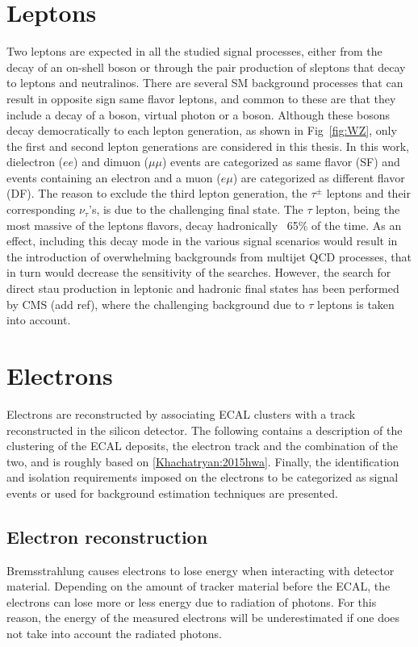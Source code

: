 \section{Leptons}
Two leptons are expected in all the studied signal processes, either from the decay of an on-shell \PZ boson or through the pair production of sleptons that decay to leptons and neutralinos. 
There are several SM background processes that can result in opposite sign same flavor leptons, and common to these are that they include a decay of a \PZ boson, virtual photon or a \PW boson. 
Although these bosons decay democratically to each lepton generation, as shown in Fig~\ref{fig:WZ}, only the first and second lepton generations are considered in this thesis. 
In this work, dielectron ($ee$) and dimuon ($\mu\mu$) events are categorized as same flavor (SF) and events containing an electron and a muon ($e\mu$) are categorized as different flavor (DF). 
The reason to exclude the third lepton generation, the $\tau^{\pm}$ leptons and their corresponding $\nu_{\tau}$'s, is due to the challenging final state. 
The $\tau$ lepton, being the most massive of the leptons flavors, decay hadronically ~65\% of the time. 
As an effect, including this decay mode in the various signal scenarios would result in the introduction of overwhelming backgrounds from multijet QCD processes, that in turn would decrease the sensitivity of the searches. 
However, the search for direct stau production in leptonic and hadronic final states has been performed by CMS (add ref), where the challenging background due to $\tau$ leptons is taken into account.  
\section{Electrons}
\label{subsub:electrons}
Electrons are reconstructed by associating ECAL clusters with a track reconstructed in the silicon detector. 
The following contains a description of the clustering of the ECAL deposits, the electron track and the combination of the two, and is roughly based on \ref{Khachatryan:2015hwa}. 
Finally, the identification and isolation requirements imposed on the electrons to be categorized as signal events or used for background estimation techniques are presented. 
\subsection{Electron reconstruction}
Bremsstrahlung causes electrons to lose energy when interacting with detector material. 
Depending on the amount of tracker material before the ECAL, the electrons can lose more or less energy due to radiation of photons. 
For this reason, the energy of the measured electrons will be underestimated if one does not take into account the radiated photons. 
